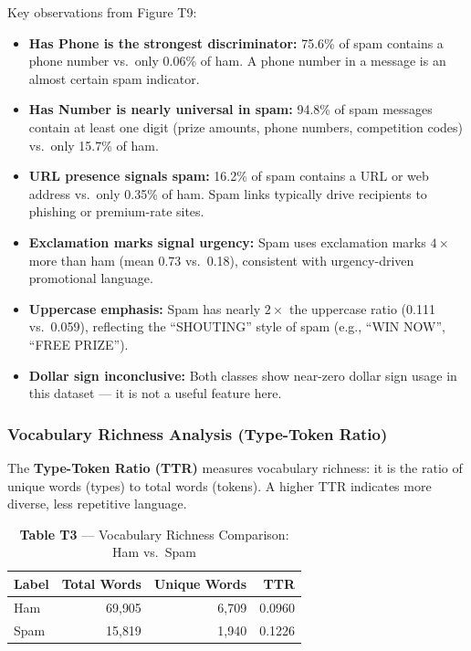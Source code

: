 Key observations from Figure T9:
\begin{itemize}
    \item \textbf{Has Phone is the strongest discriminator:} 75.6\% of spam contains a phone number vs.\ only 0.06\% of ham. A phone number in a message is an almost certain spam indicator.
    \item \textbf{Has Number is nearly universal in spam:} 94.8\% of spam messages contain at least one digit (prize amounts, phone numbers, competition codes) vs.\ only 15.7\% of ham.
    \item \textbf{URL presence signals spam:} 16.2\% of spam contains a URL or web address vs.\ only 0.35\% of ham. Spam links typically drive recipients to phishing or premium-rate sites.
    \item \textbf{Exclamation marks signal urgency:} Spam uses exclamation marks $4\times$ more than ham (mean 0.73 vs.\ 0.18), consistent with urgency-driven promotional language.
    \item \textbf{Uppercase emphasis:} Spam has nearly $2\times$ the uppercase ratio (0.111 vs.\ 0.059), reflecting the ``SHOUTING'' style of spam (e.g., ``WIN NOW'', ``FREE PRIZE'').
    \item \textbf{Dollar sign inconclusive:} Both classes show near-zero dollar sign usage in this dataset --- it is not a useful feature here.
\end{itemize}

\subsubsection{Vocabulary Richness Analysis (Type-Token Ratio)}

The \textbf{Type-Token Ratio (TTR)} measures vocabulary richness: it is the ratio of unique words (types) to total words (tokens). A higher TTR indicates more diverse, less repetitive language.

\begin{table}[H]
\centering
\caption{\textbf{Table T3} --- Vocabulary Richness Comparison: Ham vs.\ Spam}
\label{tab:text_ttr}
\begin{tabular}{lrrr}
\hline
\textbf{Label} & \textbf{Total Words} & \textbf{Unique Words} & \textbf{TTR} \\
\hline
Ham  & 69{,}905 & 6{,}709 & 0.0960 \\
Spam & 15{,}819 & 1{,}940 & 0.1226 \\
\hline
\end{tabular}
\end{table}

